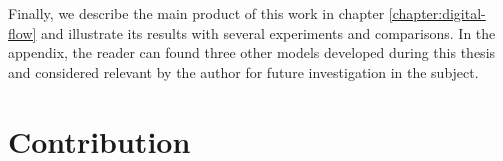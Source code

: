Finally, we describe the main product of this work in chapter \ref{chapter:digital-flow} and illustrate its results with several experiments and comparisons. In the appendix, the reader can found three other models developed during this thesis and considered relevant by the author for future investigation in the subject.

\section{Contribution}

